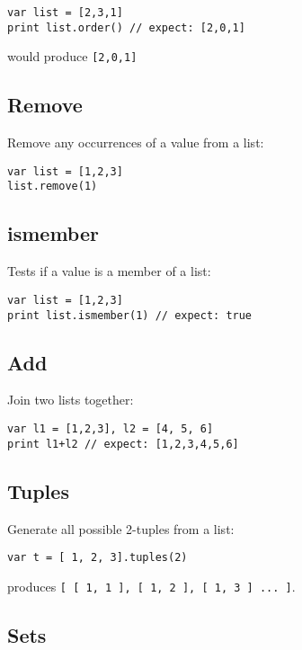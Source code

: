 \begin{lstlisting}
var list = [2,3,1]
print list.order() // expect: [2,0,1]
\end{lstlisting}

would produce \texttt{{[}2,0,1{]}}

\hypertarget{remove}{%
\subsection{Remove}\label{remove}}

Remove any occurrences of a value from a list:

\begin{lstlisting}
var list = [1,2,3]
list.remove(1)
\end{lstlisting}

\hypertarget{ismember}{%
\subsection{ismember}\label{ismember}}

Tests if a value is a member of a list:

\begin{lstlisting}
var list = [1,2,3]
print list.ismember(1) // expect: true
\end{lstlisting}

\hypertarget{add}{%
\subsection{Add}\label{add}}

Join two lists together:

\begin{lstlisting}
var l1 = [1,2,3], l2 = [4, 5, 6]
print l1+l2 // expect: [1,2,3,4,5,6]
\end{lstlisting}

\hypertarget{tuples}{%
\subsection{Tuples}\label{tuples}}

Generate all possible 2-tuples from a list:

\begin{lstlisting}
var t = [ 1, 2, 3].tuples(2)
\end{lstlisting}

produces
\texttt{{[}\ {[}\ 1,\ 1\ {]},\ {[}\ 1,\ 2\ {]},\ {[}\ 1,\ 3\ {]}\ ...\ {]}}.

\hypertarget{sets}{%
\subsection{Sets}\label{sets}}

